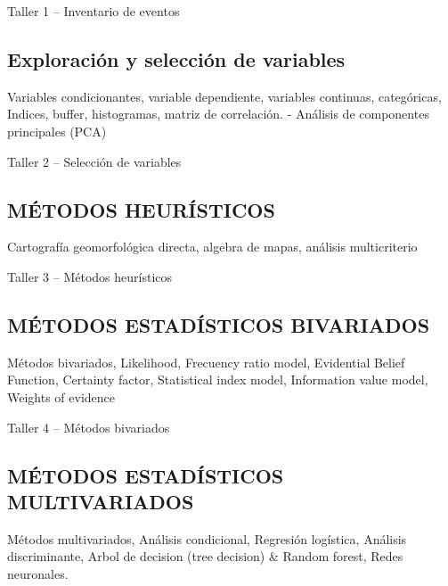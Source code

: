 \documentclass[twoside,11pt,]{article}
\begin{document}
\begin{tcolorbox}[enhanced,width=5in,center upper,  fontupper=\large\bfseries,drop shadow southwest,sharp corners]
Taller 1 -- Inventario de eventos
\end{tcolorbox}

\subsection {Exploración y selección de variables}
Variables condicionantes, variable dependiente, variables continuas, categóricas, Indices, buffer, histogramas, matriz de correlación.
-	Análisis de componentes principales (PCA)

\begin{tcolorbox}[enhanced,width=5in,center upper,  fontupper=\large\bfseries,drop shadow southwest,sharp corners]
Taller 2 -- Selección de variables
\end{tcolorbox}

\subsection {MÉTODOS HEURÍSTICOS}
Cartografía geomorfológica directa, algebra de mapas, análisis multicriterio

\begin{tcolorbox}[enhanced,width=5in,center upper,  fontupper=\large\bfseries,drop shadow southwest,sharp corners]
Taller 3 -- Métodos heurísticos
\end{tcolorbox}

\subsection {MÉTODOS ESTADÍSTICOS BIVARIADOS}
Métodos bivariados, Likelihood, Frecuency ratio model, Evidential Belief Function, Certainty factor, Statistical index model, Information value model, Weights of evidence

\begin{tcolorbox}[enhanced,width=5in,center upper,  fontupper=\large\bfseries,drop shadow southwest,sharp corners]
Taller 4 -- Métodos bivariados
\end{tcolorbox}

\subsection {MÉTODOS ESTADÍSTICOS MULTIVARIADOS}
Métodos multivariados, Análisis condicional, Regresión logística, Análisis discriminante, Arbol de decision (tree decision) \& Random forest, Redes neuronales.
\end{document}
